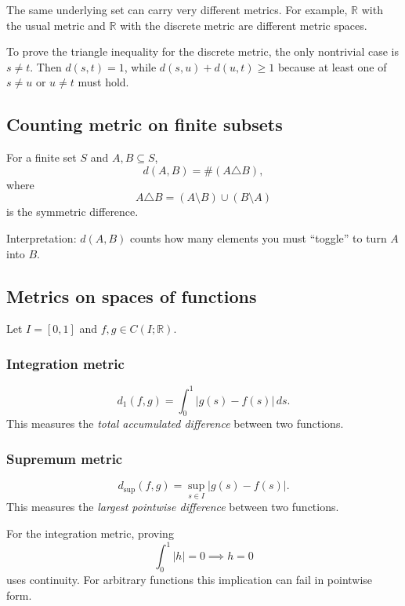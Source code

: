 \documentclass[11pt,a4paper]{article}
\newcommand{\R}{\mathbb{R}}
\begin{document}
\begin{keybox}
The same underlying set can carry very different metrics. For example, $\R$ with the usual metric and $\R$ with the discrete metric are different metric spaces.
\end{keybox}

\begin{exambox}
To prove the triangle inequality for the discrete metric, the only nontrivial case is $s\neq t$. Then $d(s,t)=1$, while $d(s,u)+d(u,t)\ge 1$ because at least one of $s\neq u$ or $u\neq t$ must hold.
\end{exambox}

\subsection{Counting metric on finite subsets}
For a finite set $S$ and $A,B\subseteq S$,
\[
d(A,B)=\#(A\triangle B),
\]
where
\[
A\triangle B=(A\setminus B)\cup(B\setminus A)
\]
is the symmetric difference.

\begin{keybox}
Interpretation: $d(A,B)$ counts how many elements you must ``toggle'' to turn $A$ into $B$.
\end{keybox}

\subsection{Metrics on spaces of functions}
Let $I=[0,1]$ and $f,g\in C(I;\R)$.

\subsubsection{Integration metric}
\[
d_1(f,g)=\int_0^1 |g(s)-f(s)|\,ds.
\]
This measures the \emph{total accumulated difference} between two functions.

\subsubsection{Supremum metric}
\[
d_{\sup}(f,g)=\sup_{s\in I}|g(s)-f(s)|.
\]
This measures the \emph{largest pointwise difference} between two functions.

\begin{trapbox}
For the integration metric, proving
\[
\int_0^1 |h|=0 \implies h=0
\]
uses continuity. For arbitrary functions this implication can fail in pointwise form.
\end{trapbox}
\end{document}
